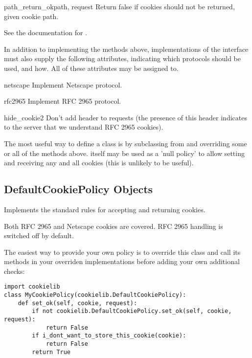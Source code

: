 \begin{methoddesc}[CookiePolicy]{path_return_ok}{path, request}
Return false if cookies should not be returned, given cookie path.

See the documentation for .
\end{methoddesc}


In addition to implementing the methods above, implementations of the
 interface must also supply the following
attributes, indicating which protocols should be used, and how.  All
of these attributes may be assigned to.

\begin{memberdesc}{netscape}
Implement Netscape protocol.
\end{memberdesc}
\begin{memberdesc}{rfc2965}
Implement RFC 2965 protocol.
\end{memberdesc}
\begin{memberdesc}{hide_cookie2}
Don't add  header to requests (the presence of
this header indicates to the server that we understand RFC 2965
cookies).
\end{memberdesc}

The most useful way to define a  class is by
subclassing from  and overriding some or
all of the methods above.   itself may be used as
a 'null policy' to allow setting and receiving any and all cookies
(this is unlikely to be useful).


\subsection{DefaultCookiePolicy Objects \label{default-cookie-policy-objects}}

Implements the standard rules for accepting and returning cookies.

Both RFC 2965 and Netscape cookies are covered.  RFC 2965 handling is
switched off by default.

The easiest way to provide your own policy is to override this class
and call its methods in your overriden implementations before adding
your own additional checks:

\begin{verbatim}
import cookielib
class MyCookiePolicy(cookielib.DefaultCookiePolicy):
    def set_ok(self, cookie, request):
        if not cookielib.DefaultCookiePolicy.set_ok(self, cookie, request):
            return False
        if i_dont_want_to_store_this_cookie(cookie):
            return False
        return True
\end{verbatim}

